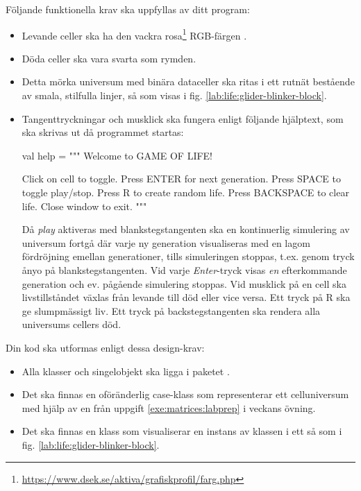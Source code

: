 Följande funktionella krav ska uppfyllas av ditt program:
\begin{itemize}[nosep, label={$\square$},]
\item Levande celler ska ha den vackra rosa\footnote{\url{https://www.dsek.se/aktiva/grafiskprofil/farg.php}} RGB-färgen .
\item Döda celler ska vara svarta som rymden.
\item Detta mörka universum med binära dataceller ska ritas i ett rutnät bestående av smala, stilfulla linjer, så som visas i fig. \ref{lab:life:glider-blinker-block}.
\item Tangenttryckningar och musklick ska fungera enligt följande hjälptext, som ska skrivas ut då programmet startas:
\begin{CodeSmall}
  val help = """
    Welcome to GAME OF LIFE!

    Click on cell to toggle.
    Press ENTER for next generation.
    Press SPACE to toggle play/stop.
    Press R to create random life.
    Press BACKSPACE to clear life.
    Close window to exit.
  """
\end{CodeSmall}
Då \emph{play} aktiveras med blankstegstangenten ska en kontinuerlig simulering av universum fortgå där varje ny generation visualiseras med en lagom fördröjning emellan generationer, tills simuleringen stoppas, t.ex. genom tryck ånyo på blankstegstangenten. Vid varje \emph{Enter}-tryck visas \emph{en} efterkommande generation och ev. pågående simulering stoppas. Vid musklick på en cell ska livstillståndet växlas från levande till död eller vice versa. Ett tryck på R ska ge slumpmässigt liv. Ett tryck på backstegstangenten ska rendera alla universums cellers död.

\end{itemize}

\vspace{1em}\noindent Din kod ska utformas enligt dessa design-krav:
\begin{itemize}[nosep, label={$\square$}]
\item Alla klasser och singelobjekt ska ligga i paketet .
\item Det ska finnas en oföränderlig case-klass  som representerar ett celluniversum med hjälp av en  från uppgift \ref{exe:matrices:labprep} i veckans övning.
\item Det ska finnas en klass  som visualiserar en  instans av klassen  i ett   så som i fig. \ref{lab:life:glider-blinker-block}.
\end{itemize}


